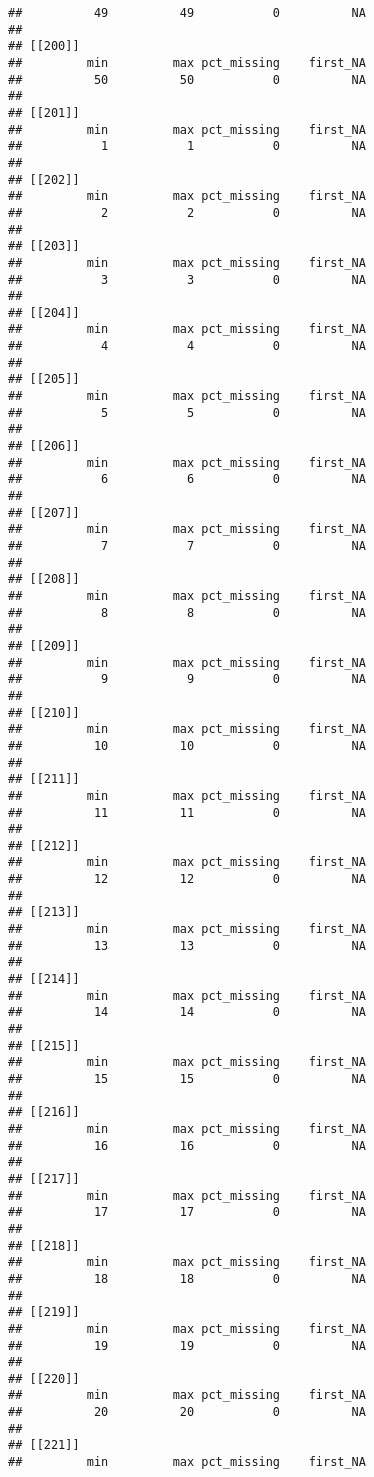\documentclass[
]{article}
\begin{document}
\begin{verbatim}
##          49          49           0          NA 
## 
## [[200]]
##         min         max pct_missing    first_NA 
##          50          50           0          NA 
## 
## [[201]]
##         min         max pct_missing    first_NA 
##           1           1           0          NA 
## 
## [[202]]
##         min         max pct_missing    first_NA 
##           2           2           0          NA 
## 
## [[203]]
##         min         max pct_missing    first_NA 
##           3           3           0          NA 
## 
## [[204]]
##         min         max pct_missing    first_NA 
##           4           4           0          NA 
## 
## [[205]]
##         min         max pct_missing    first_NA 
##           5           5           0          NA 
## 
## [[206]]
##         min         max pct_missing    first_NA 
##           6           6           0          NA 
## 
## [[207]]
##         min         max pct_missing    first_NA 
##           7           7           0          NA 
## 
## [[208]]
##         min         max pct_missing    first_NA 
##           8           8           0          NA 
## 
## [[209]]
##         min         max pct_missing    first_NA 
##           9           9           0          NA 
## 
## [[210]]
##         min         max pct_missing    first_NA 
##          10          10           0          NA 
## 
## [[211]]
##         min         max pct_missing    first_NA 
##          11          11           0          NA 
## 
## [[212]]
##         min         max pct_missing    first_NA 
##          12          12           0          NA 
## 
## [[213]]
##         min         max pct_missing    first_NA 
##          13          13           0          NA 
## 
## [[214]]
##         min         max pct_missing    first_NA 
##          14          14           0          NA 
## 
## [[215]]
##         min         max pct_missing    first_NA 
##          15          15           0          NA 
## 
## [[216]]
##         min         max pct_missing    first_NA 
##          16          16           0          NA 
## 
## [[217]]
##         min         max pct_missing    first_NA 
##          17          17           0          NA 
## 
## [[218]]
##         min         max pct_missing    first_NA 
##          18          18           0          NA 
## 
## [[219]]
##         min         max pct_missing    first_NA 
##          19          19           0          NA 
## 
## [[220]]
##         min         max pct_missing    first_NA 
##          20          20           0          NA 
## 
## [[221]]
##         min         max pct_missing    first_NA 

\end{verbatim}
\end{document}
